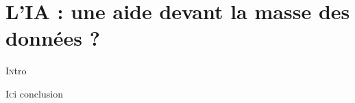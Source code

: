 \chapter[Gérer la prolifération]{\label{III-C}L'IA : une aide devant la masse des données ?}



\lettrine{I}ntro





\bigskip
\bigskip
\bigskip

\lettrine{I}ci conclusion
